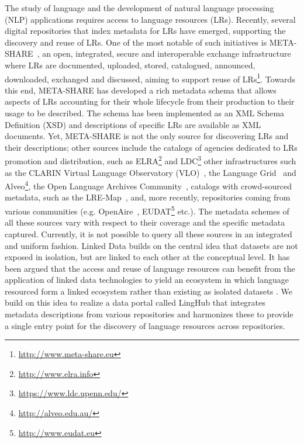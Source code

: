 \documentclass[smallextended]{svjour3}       %
\begin{document}
The study of language and the development of natural language processing (NLP)
applications requires access to language resources (LRs). Recently, several
digital repositories that index metadata for LRs have emerged, supporting the
discovery and reuse of LRs. One of the most notable of such initiatives is
META-SHARE~\cite{federmann2012meta}, an open, integrated, secure and interoperable exchange
infrastructure where LRs are documented, uploaded, stored, catalogued,
announced, downloaded, exchanged and discussed, aiming to support reuse of
LRs\footnote{\url{http://www.meta-share.eu}}. Towards this end, META-SHARE has developed a rich
metadata schema that allows aspects of LRs accounting for their whole lifecycle
from their production to their usage to be described. The schema has been
implemented as an XML Schema Definition (XSD) and descriptions of specific LRs
are available as XML documents. Yet, META-SHARE is not the only source for
discovering LRs and their descriptions; other sources include the catalogs of
agencies dedicated to LRs promotion and distribution, such as
ELRA\footnote{\url{http://www.elra.info}} and
LDC\footnote{\url{https://www.ldc.upenn.edu/}}
other infrastructures such as the CLARIN Virtual Language Observatory
(VLO)~\cite{van2012semantic}, the Language Grid~\cite{ishida2006language} and
Alveo\footnote{\url{http://alveo.edu.au/}}, the Open Language Archives
Community~\cite[OLAC]{simons2003open}, catalogs with crowd-sourced metadata,
such as the LRE-Map~\cite{calzolari2012lre}, and,
more recently, repositories coming from various communities (e.g.
OpenAire~\cite{manghi2010infrastructure},
EUDAT\footnote{\url{http://www.eudat.eu}} etc.). The metadata schemes of all these sources vary with respect to
their coverage and the specific metadata captured. Currently, it is not
possible to query all these sources in an integrated and uniform fashion. 
Linked Data builds on the central idea that datasets are not exposed in
isolation, but are linked to each other at the conceptual level. 
It has been argued that the access and reuse of language resources can benefit
from the application of linked data technologies to yield an ecosystem in which
language resourced form a linked ecosystem rather than existing as isolated
datasets \cite{}. We build on this idea to realize a data portal called LingHub
that integrates metadata descriptions from various repositories and harmonizes
these to provide a single entry point for the discovery of language resources
across repositories. 
\end{document}
